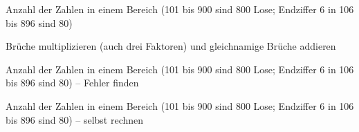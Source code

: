 \begin{aufgabe}{Anzahl der Zahlen in einem Bereich (101 bis 900 sind 800 Lose; Endziffer 6 in 106 bis 896 sind 80)}
\end{aufgabe}

\begin{aufgabe}{Brüche multiplizieren (auch drei Faktoren) und gleichnamige Brüche addieren}
\end{aufgabe}

\begin{aufgabe}{Anzahl der Zahlen in einem Bereich (101 bis 900 sind 800 Lose; Endziffer 6 in 106 bis 896 sind 80) – Fehler finden}
\end{aufgabe}

\begin{aufgabe}{Anzahl der Zahlen in einem Bereich (101 bis 900 sind 800 Lose; Endziffer 6 in 106 bis 896 sind 80) – selbst rechnen}
\end{aufgabe}

